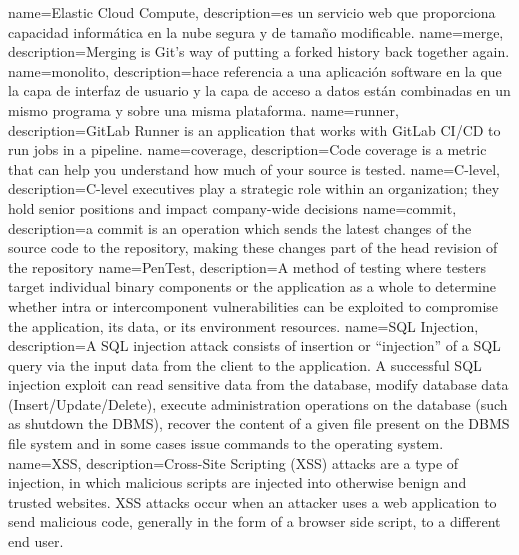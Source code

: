 {
        name=Elastic Cloud Compute,
        description={es un servicio web que proporciona capacidad informática en la nube segura y de tamaño modificable.}
}
{
        name=merge,
        description={Merging is Git's way of putting a forked history back together again.}
}
{
        name=monolito,
        description={hace referencia a una aplicación software en la que la capa
        de interfaz de usuario y la capa de acceso a datos están combinadas en
        un mismo programa y sobre una misma plataforma. }
}
{
        name=runner,
        description={GitLab Runner is an application that works with GitLab
        CI/CD to run jobs in a pipeline.}
}
{
        name=coverage,
        description={Code coverage is a metric that can help you understand how
        much of your source is tested.}
}
{
        name=C-level,
        description={C-level executives play a strategic role within an
        organization; they hold senior positions and impact company-wide
        decisions}
}
{
       name=commit,
       description={a commit is an operation which sends the latest changes of
       the source code to the repository, making these changes part of the head
       revision of the repository}
}
{
        name=PenTest,
        description={A method of testing where testers target individual binary
        components or the application as a whole to determine whether intra or
        intercomponent vulnerabilities can be exploited to compromise the
        application, its data, or its environment resources.}
}
{
        name=SQL Injection,
        description={A SQL injection attack consists of insertion or “injection”
        of a SQL query via the input data from the client to the application. A
        successful SQL injection exploit can read sensitive data from the
        database, modify database data (Insert/Update/Delete), execute
        administration operations on the database (such as shutdown the DBMS),
        recover the content of a given file present on the DBMS file system and
        in some cases issue commands to the operating system.}
}
{
        name=XSS,
        description={Cross-Site Scripting (XSS) attacks are a type of injection,
        in which malicious scripts are injected into otherwise benign and
        trusted websites. XSS attacks occur when an attacker uses a web
        application to send malicious code, generally in the form of a browser
        side script, to a different end user.}
}
